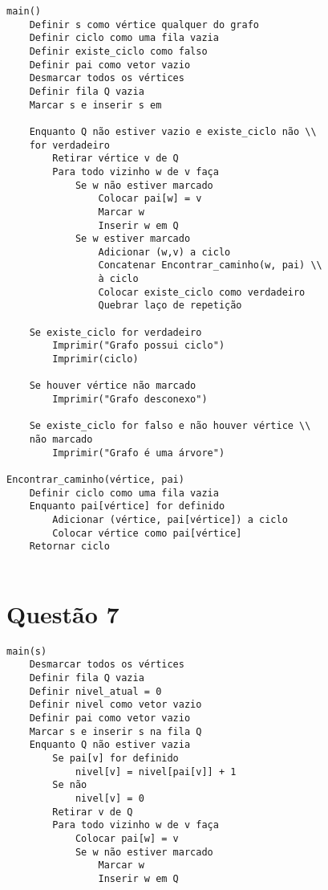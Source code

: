 \documentclass{article}
\begin{document}
\begin{lstlisting}
main()
    Definir s como vértice qualquer do grafo
    Definir ciclo como uma fila vazia
    Definir existe_ciclo como falso
    Definir pai como vetor vazio
    Desmarcar todos os vértices
    Definir fila Q vazia
    Marcar s e inserir s em 
    
    Enquanto Q não estiver vazio e existe_ciclo não \\
    for verdadeiro
        Retirar vértice v de Q
        Para todo vizinho w de v faça
            Se w não estiver marcado
                Colocar pai[w] = v
                Marcar w
                Inserir w em Q
            Se w estiver marcado
                Adicionar (w,v) a ciclo
                Concatenar Encontrar_caminho(w, pai) \\ 
                à ciclo
                Colocar existe_ciclo como verdadeiro
                Quebrar laço de repetição
    
    Se existe_ciclo for verdadeiro
        Imprimir("Grafo possui ciclo")
        Imprimir(ciclo)
    
    Se houver vértice não marcado
        Imprimir("Grafo desconexo")
    
    Se existe_ciclo for falso e não houver vértice \\ 
    não marcado
        Imprimir("Grafo é uma árvore")

Encontrar_caminho(vértice, pai)
    Definir ciclo como uma fila vazia
    Enquanto pai[vértice] for definido
        Adicionar (vértice, pai[vértice]) a ciclo
        Colocar vértice como pai[vértice]
    Retornar ciclo
    
\end{lstlisting}

\newpage
\section{Questão 7}

\begin{lstlisting}
main(s)
    Desmarcar todos os vértices
    Definir fila Q vazia
    Definir nivel_atual = 0
    Definir nivel como vetor vazio
    Definir pai como vetor vazio
    Marcar s e inserir s na fila Q
    Enquanto Q não estiver vazia
        Se pai[v] for definido 
            nivel[v] = nivel[pai[v]] + 1
        Se não
            nivel[v] = 0
        Retirar v de Q
        Para todo vizinho w de v faça
            Colocar pai[w] = v
            Se w não estiver marcado
                Marcar w
                Inserir w em Q
\end{lstlisting}
\end{document}
